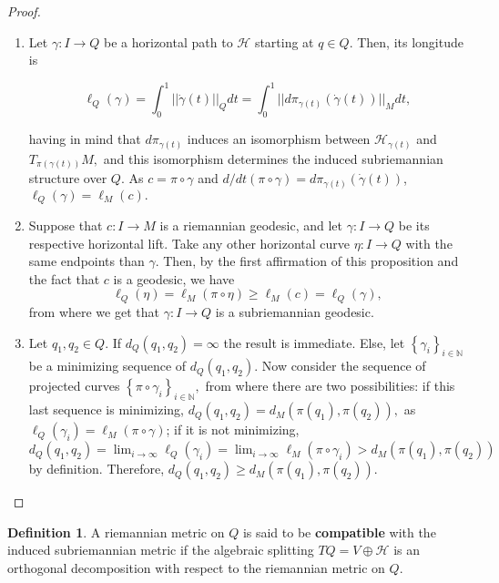 \documentclass[12pt, letterpaper, reqno]{amsart}
\theoremstyle{definition}
\newtheorem{df}{Definition}
\theoremstyle{plain}
\theoremstyle{remark}
\begin{document}
\begin{proof}
	\begin{enumerate}
		\item Let $ \gamma: I \rightarrow {Q} $ be a horizontal path to $ \mathcal{H} $ starting at $ q\in Q. $ Then, its longitude is 

		$$\ell_Q(\gamma) = \int_0^1 ||\dot{\gamma} (t) ||_{Q} dt = \int_0^1 || d\pi_{\gamma(t)}(\dot{\gamma}(t))||_M dt,$$ 

		having in mind that $d\pi_{\gamma(t)}$ induces an isomorphism between $ \mathcal{H}_{\gamma(t)} $ and $ T_{\pi(\gamma(t))} M,$ and this isomorphism determines the induced subriemannian structure over $ Q. $ As $c=\pi\circ\gamma$ and $ d/dt(\pi\circ\gamma) = d\pi_{\gamma(t)}(\dot{\gamma}(t)) $, $ \ell_Q(\gamma)=\ell_M(c). $  

		\item Suppose that $ c: I \rightarrow {M} $ is a riemannian geodesic, and let $ \gamma: I \rightarrow {Q} $ be its respective horizontal lift. Take any other horizontal curve $ \eta: I \rightarrow {Q} $ with the same endpoints than $ \gamma. $ Then, by the first affirmation of this proposition and the fact that $ c $ is a geodesic, we have
			$$ \ell_Q(\eta) = \ell_M(\pi\circ \eta) \geq \ell_M(c) = \ell_Q(\gamma),  $$ 
		from where we get that $ \gamma: I \rightarrow {Q} $ is a subriemannian geodesic.

	\item Let $ q_1,q_2\in Q. $ If $ d_Q(q_1,q_2) = \infty $ the result is immediate. Else, let $ \left\{ \gamma_i \right\}_{i\in \mathbb{N}} $ be a minimizing sequence of $ d_Q(q_1,q_2). $ Now consider the sequence of projected curves $ \left\{ \pi\circ\gamma_i \right\}_{i\in \mathbb{N}}, $ from where there are two possibilities: if this last sequence is minimizing, $ d_Q(q_1, q_2) = d_M(\pi(q_1), \pi(q_2)),$ as $ \ell_Q(\gamma_i)=\ell_M(\pi\circ\gamma) $;  if it is not minimizing,  $d_Q(q_1,q_2) = \lim_{i \rightarrow \infty} \ell_Q(\gamma_i) = \lim_{i \rightarrow \infty} \ell_M(\pi\circ\gamma_i) > d_M(\pi(q_1),\pi(q_2))$ by definition. Therefore, $ d_Q(q_1,q_2)\geq d_M(\pi(q_1),\pi(q_2)).$
	\end{enumerate}
\end{proof}

\begin{df}
	A riemannian metric on $ Q $ is said to be \textbf{compatible} with the induced subriemannian metric if the algebraic splitting $ TQ = V \oplus \mathcal{H} $ is an orthogonal decomposition with respect to the riemannian metric on $ Q$.  
\end{df}
\end{document}
